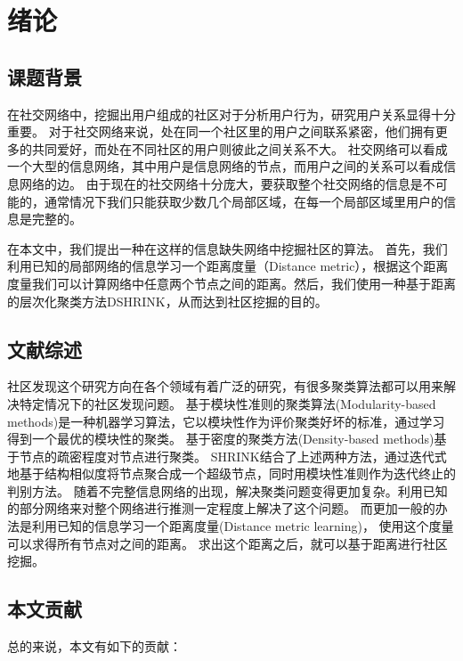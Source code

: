\chapter{绪论}
\label{chap:intro}

\section{课题背景}

在社交网络中，挖掘出用户组成的社区对于分析用户行为，研究用户关系显得十分重要。
对于社交网络来说，处在同一个社区里的用户之间联系紧密，他们拥有更多的共同爱好，而处在不同社区的用户则彼此之间关系不大。
社交网络可以看成一个大型的信息网络，其中用户是信息网络的节点，而用户之间的关系可以看成信息网络的边。
由于现在的社交网络十分庞大，要获取整个社交网络的信息是不可能的，通常情况下我们只能获取少数几个局部区域，在每一个局部区域里用户的信息是完整的。

在本文中，我们提出一种在这样的信息缺失网络中挖掘社区的算法。
首先，我们利用已知的局部网络的信息学习一个距离度量（Distance metric），根据这个距离度量我们可以计算网络中任意两个节点之间的距离。然后，我们使用一种基于距离的层次化聚类方法DSHRINK，从而达到社区挖掘的目的。

\section{文献综述}

社区发现这个研究方向在各个领域有着广泛的研究，有很多聚类算法都可以用来解决特定情况下的社区发现问题。
基于模块性准则的聚类算法(Modularity-based methods)是一种机器学习算法，它以模块性作为评价聚类好坏的标准，通过学习得到一个最优的模块性的聚类。
基于密度的聚类方法(Density-based methods)基于节点的疏密程度对节点进行聚类。
SHRINK结合了上述两种方法，通过迭代式地基于结构相似度将节点聚合成一个超级节点，同时用模块性准则作为迭代终止的判别方法。
随着不完整信息网络的出现，解决聚类问题变得更加复杂。利用已知的部分网络来对整个网络进行推测一定程度上解决了这个问题。
而更加一般的办法是利用已知的信息学习一个距离度量(Distance metric learning)，
使用这个度量可以求得所有节点对之间的距离。
求出这个距离之后，就可以基于距离进行社区挖掘。

\section{本文贡献}
总的来说，本文有如下的贡献：

